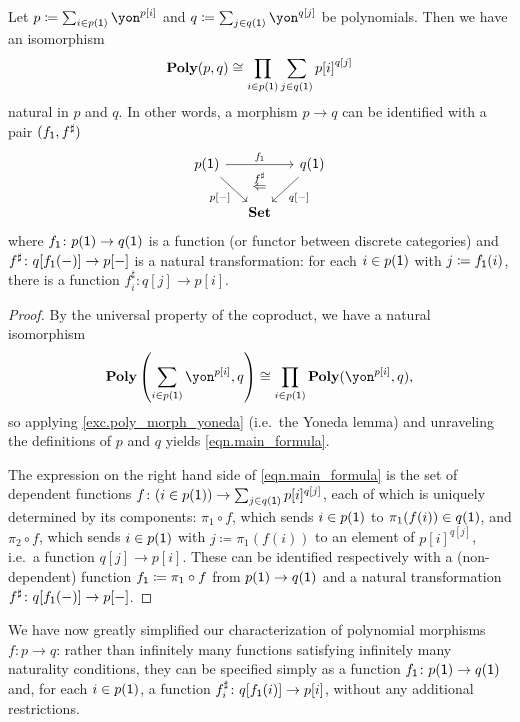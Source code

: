 \documentclass[Book-Poly]{subfiles}
\begin{document}
\begin{proposition}\label{prop.poly_maps_prod_sum}
Let $p\coloneqq\sum_{i\in p(\1)}\yon^{p[i]}$ and $q\coloneqq\sum_{j\in q(\1)}\yon^{q[j]}$ be polynomials.
Then we have an isomorphism
\begin{equation}\label{eqn.main_formula}
\mathbf{Poly}(p,q)\cong\prod_{i\in p(\textsf{1})}\sum_{j\in q(\textsf{1})}{p[i]}^{q[j]}
\end{equation}
natural in $p$ and $q$.
In other words, a morphism $p\to q$ can be identified with a pair $(f_{\textsf{1}},f^\sharp)$
\begin{equation}\label{eqn.colax_poly_map}
\begin{tikzcd}[column sep=small]
	p(\1)\ar[dr, "p{[-]}"']\ar[rr, "f_\1"]&~&
	q(\1)\ar[dl, "q{[-]}"]\\&
	\smset\ar[u, phantom, near end, "\overset{f^\sharp}{\Leftarrow}"]
\end{tikzcd}
\end{equation}
where $f_{\textsf{1}} \colon p(\textsf{1}) \to q(\textsf{1})$ is a function (or functor between discrete categories) and $f^\sharp \colon q[f_{\textsf{1}}(-)] \to p[-]$ is a natural transformation: for each $i\in p(\textsf{1})$ with $j\coloneqq f_{\textsf{1}}(i)$, there is a function $f^\sharp_i\colon q[j]\to p[i]$.
\end{proposition}
\begin{proof}
By the universal property of the coproduct, we have a natural isomorphism
\[
    \poly\left(\sum_{i \in p(\1)}\yon^{p[i]}, q\right) \iso \prod_{i \in p(\1)} \poly(\yon^{p[i]}, q),
\]
so applying \cref{exc.poly_morph_yoneda} (i.e.\ the Yoneda lemma) and unraveling the definitions of $p$ and $q$ yields \eqref{eqn.main_formula}.

The expression on the right hand side of \eqref{eqn.main_formula} is the set of dependent functions $f \colon (i \in p(\textsf{1})) \to \sum_{j \in q(\textsf{1})} p[i]^{q[j]}$, each of which is uniquely determined by its components: $\pi_1 \circ f$, which sends $i \in p(\textsf{1})$ to $\pi_1(f(i)) \in q(\textsf{1})$, and $\pi_2 \circ f$, which sends $i \in p(\textsf{1})$ with $j \coloneqq \pi_1(f(i))$ to an element of $p[i]^{q[j]}$, i.e.\ a function $q[j] \to p[i]$.
These can be identified respectively with a (non-dependent) function $f_{\textsf{1}} \coloneqq \pi_1 \circ f$ from $p(\textsf{1}) \to q(\textsf{1})$ and a natural transformation $f^\sharp \colon q[f_{\textsf{1}}(-)] \to p[-]$.
\end{proof}

We have now greatly simplified our characterization of polynomial morphisms $f \colon p \to q$: rather than infinitely many functions satisfying infinitely many naturality conditions, they can be specified simply as a function $f_{\textsf{1}} \colon p(\textsf{1}) \to q(\textsf{1})$ and, for each $i \in p(\textsf{1})$, a function $f^\sharp_i \colon q[f_{\textsf{1}}(i)] \to p[i]$, without any additional restrictions.
\end{document}
